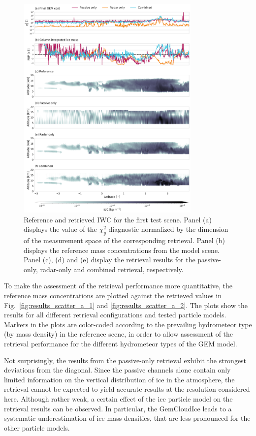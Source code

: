 \documentclass[journal abbreviation, manuscript]{copernicus}
\begin{document}
\begin{figure}
\centering
\includegraphics[width = 0.8\textwidth]{../plots/results_a_LargePlateAggregate}
\caption{Reference and retrieved IWC for the first test scene. Panel (a)
  displays the value of the $\chi^2_y$ diagnostic normalized by the dimension of
  the measurement space of the corresponding retrieval. Panel (b) displays the
  reference mass concentrations from the model scene. Panel (c), (d) and (e)
  display the retrieval results for the passive-only, radar-only and combined
  retrieval, respectively.}
\label{fig:results_a}
\end{figure}

To make the assessment of the retrieval performance more quantitative, the
reference mass concentrations are plotted against the retrieved values in
Fig.~\ref{fig:results_scatter_a_1} and \ref{fig:results_scatter_a_2}. The plots
show the results for all different retrieval configurations and tested
particle models. Markers in the plots are color-coded according to the
prevailing hydrometeor type (by mass density) in the reference scene, in order
to allow assessment of the retrieval performance for the different hydrometeor
types of the GEM model.

Not surprisingly, the results from the passive-only retrieval exhibit the
strongest deviations from the diagonal. Since the passive channels alone contain
only limited information on the vertical distribution of ice in the atmosphere,
the retrieval cannot be expected to yield accurate results at the resolution
considered here. Although rather weak, a certain effect of the ice particle
model on the retrieval results can be observed. In particular, the GemCloudIce
leads to a systematic underestimation of ice mass densities, that are less
pronounced for the other particle models.
\end{document}
